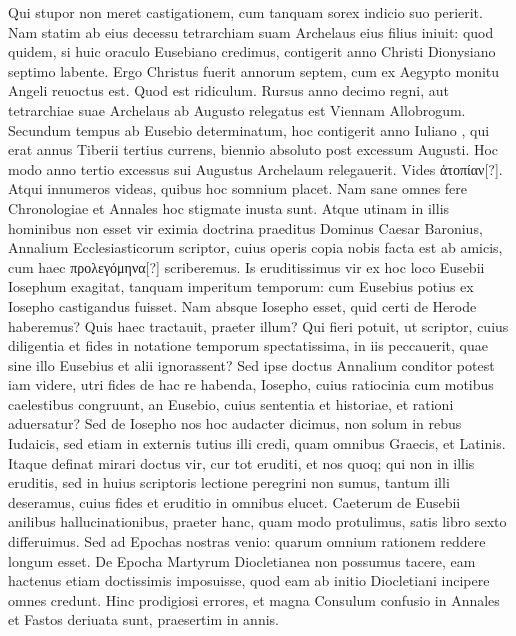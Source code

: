 Qui stupor non meret castigationem, cum tanquam sorex indicio
 suo perierit.
Nam statim ab eius decessu tetrarchiam suam Archelaus eius filius
iniuit: quod quidem, si huic oraculo Eusebiano credimus, contigerit
anno Christi Dionysiano septimo labente.
Ergo Christus fuerit
annorum septem, cum ex Aegypto monitu Angeli reuoctus est.
Quod est ridiculum.
Rursus anno decimo regni, aut tetrarchiae suae
Archelaus ab Augusto relegatus est Viennam Allobrogum.
Secundum tempus ab Eusebio determinatum, hoc contigerit anno Iuliano
, qui erat annus Tiberii tertius currens, biennio absoluto
post excessum Augusti.
Hoc modo anno tertio excessus sui Augustus
Archelaum relegauerit.
Vides \textgreek{ἀτοπίαν[?]}.
Atqui innumeros videas,
quibus hoc somnium placet.
Nam sane omnes fere Chronologiae
et Annales hoc stigmate inusta sunt.
Atque utinam in illis hominibus
non esset vir eximia doctrina praeditus Dominus Caesar Baronius,
Annalium Ecclesiasticorum scriptor, cuius operis copia nobis
facta est ab amicis, cum haec \textgreek{προλεγόμηνα[?]} scriberemus.
Is eruditissimus
vir ex hoc loco Eusebii Iosephum exagitat, tanquam imperitum
temporum: cum Eusebius potius ex Iosepho castigandus fuisset.
Nam absque Iosepho esset, quid certi de Herode haberemus?
Quis haec tractauit, praeter illum?
Qui fieri potuit, ut scriptor, cuius diligentia
et fides in notatione temporum spectatissima, in iis peccauerit,
quae sine illo Eusebius et alii ignorassent?
Sed ipse doctus Annalium
conditor potest iam videre, utri fides de hac re habenda, Iosepho,
cuius ratiocinia cum motibus caelestibus congruunt, an Eusebio,
cuius sententia et historiae, et rationi aduersatur?
Sed de Iosepho
nos hoc audacter dicimus, non solum in rebus Iudaicis, sed etiam
in externis tutius illi credi, quam omnibus Graecis, et Latinis.
Itaque
definat mirari doctus vir, cur tot eruditi, et nos quoq; qui non in illis
eruditis, sed in huius scriptoris lectione peregrini non sumus, tantum
illi deseramus, cuius fides et eruditio in omnibus elucet.
Caeterum de Eusebii anilibus hallucinationibus, praeter hanc, quam
modo protulimus, satis libro sexto differuimus.
Sed ad Epochas
nostras venio: quarum omnium rationem reddere longum esset.
De Epocha Martyrum Diocletianea non possumus tacere, eam hactenus
etiam doctissimis imposuisse, quod eam ab initio Diocletiani
incipere omnes credunt.
Hinc prodigiosi errores, et magna Consulum
confusio in Annales et Fastos deriuata sunt, praesertim in annis.
